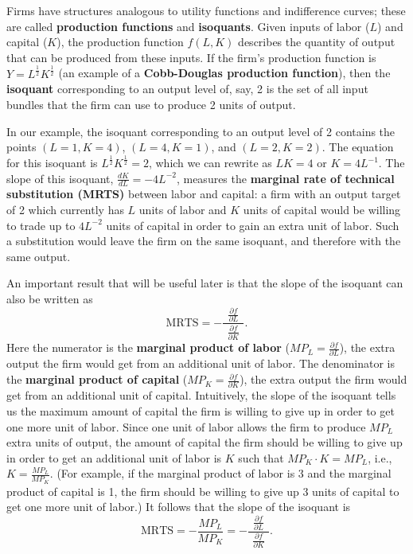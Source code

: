 Firms have structures analogous to utility functions and indifference curves; these are called \textbf{production functions} and \textbf{isoquants}. Given inputs of labor ($L$) and capital ($K$), the production function $f(L, K)$ describes the quantity of output that can be produced from these inputs. If the firm's production function is $Y=L^{\frac{1}{2}}K^{\frac{1}{2}}$ (an example of a \textbf{Cobb-Douglas production function}), then the \textbf{isoquant} corresponding to an output level of, say, 2 is the set of all input bundles that the firm  can use to produce 2 units of output.

In our example, the isoquant corresponding to an output level of 2 contains the points $(L=1, K=4)$, $(L=4, K=1)$, and $(L=2, K=2)$. The equation for this isoquant is $L^{\frac{1}{2}}K^{\frac{1}{2}}=2$, which we can rewrite as $LK=4$ or $K=4L^{-1}$. The slope of this isoquant, $\displaystyle\frac{dK}{dL}=-4L^{-2}$, measures the \textbf{marginal rate of technical substitution (MRTS)} between labor and capital: a firm with an output target of 2 which currently has $L$ units of labor and $K$ units of capital would be willing to trade up to $4L^{-2}$ units of capital in order to gain an extra unit of labor. Such a substitution would leave the firm on the same isoquant, and therefore with the same output.

An important result that will be useful later is that the slope of the isoquant can also be written as
\[
\mbox{MRTS}=-\frac{\ \ \frac{\partial f}{\partial L}\ \
}{\frac{\partial f}{\partial K}}.
\]
Here the numerator is the \textbf{marginal product of labor} ($MP_L=\displaystyle\frac{\partial f}{\partial L}$), the extra output the firm would get from an additional unit of labor. The denominator is the \textbf{marginal product of capital} ($MP_K=\displaystyle\frac{\partial f}{\partial K}$), the extra output the firm would get from an additional unit of capital. Intuitively, the slope of the isoquant tells us the maximum amount of capital the firm is willing to give up in order to get one more unit of labor. Since one unit of labor allows the firm to produce $MP_L$ extra units of output, the amount of capital the firm should be willing to give up in order to get an additional unit of labor is $K$ such that $MP_K\cdot K=MP_L$, i.e., $K=\displaystyle\frac{MP_L}{MP_K}$. (For example, if the marginal product of labor is 3 and the marginal product of capital is 1, the firm should be willing to give up 3 units of capital to get one more unit of labor.) It follows that the slope of the isoquant is
\[
\mbox{MRTS}=-\frac{MP_L}{MP_K}=-\frac{\ \ \frac{\partial
f}{\partial L}\ \ }{\frac{\partial f}{\partial K}}.
\]



